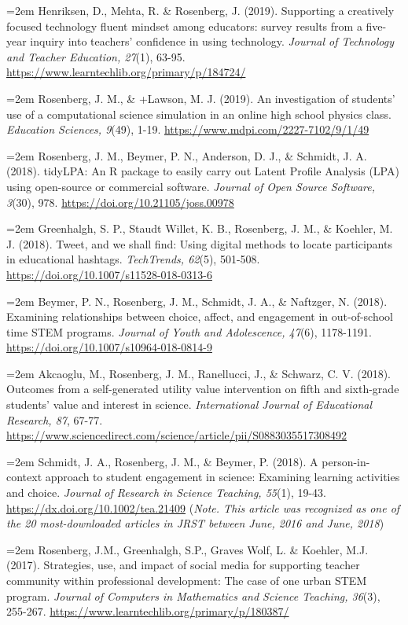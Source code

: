 \documentclass[
  14,
]{article}
\begin{document}
\hangindent=2em Henriksen, D., Mehta, R. \& Rosenberg, J. (2019).
Supporting a creatively focused technology fluent mindset among
educators: survey results from a five-year inquiry into teachers'
confidence in using technology. \emph{Journal of Technology and Teacher
Education, 27}(1), 63-95.
\url{https://www.learntechlib.org/primary/p/184724/}

\hangindent=2em Rosenberg, J. M., \& +Lawson, M. J. (2019). An
investigation of students' use of a computational science simulation in
an online high school physics class. \emph{Education Sciences, 9}(49),
1-19. \url{https://www.mdpi.com/2227-7102/9/1/49}

\hangindent=2em Rosenberg, J. M., Beymer, P. N., Anderson, D. J., \&
Schmidt, J. A. (2018). tidyLPA: An R package to easily carry out Latent
Profile Analysis (LPA) using open-source or commercial software.
\emph{Journal of Open Source Software, 3}(30), 978.
\url{https://doi.org/10.21105/joss.00978}

\hangindent=2em Greenhalgh, S. P., Staudt Willet, K. B., Rosenberg, J.
M., \& Koehler, M. J. (2018). Tweet, and we shall find: Using digital
methods to locate participants in educational hashtags.
\emph{TechTrends, 62}(5), 501-508.
\url{https://doi.org/10.1007/s11528-018-0313-6}

\hangindent=2em Beymer, P. N., Rosenberg, J. M., Schmidt, J. A., \&
Naftzger, N. (2018). Examining relationships between choice, affect, and
engagement in out-of-school time STEM programs. \emph{Journal of Youth
and Adolescence, 47}(6), 1178-1191.
\url{https://doi.org/10.1007/s10964-018-0814-9}

\hangindent=2em Akcaoglu, M., Rosenberg, J. M., Ranellucci, J., \&
Schwarz, C. V. (2018). Outcomes from a self-generated utility value
intervention on fifth and sixth-grade students' value and interest in
science. \emph{International Journal of Educational Research, 87},
67-77.
\url{https://www.sciencedirect.com/science/article/pii/S0883035517308492}

\hangindent=2em Schmidt, J. A., Rosenberg, J. M., \& Beymer, P. (2018).
A person-in-context approach to student engagement in science: Examining
learning activities and choice. \emph{Journal of Research in Science
Teaching, 55}(1), 19-43. \url{https://dx.doi.org/10.1002/tea.21409}
(\emph{Note. This article was recognized as one of the 20
most-downloaded articles in JRST between June, 2016 and June, 2018})

\hangindent=2em Rosenberg, J.M., Greenhalgh, S.P., Graves Wolf, L. \&
Koehler, M.J. (2017). Strategies, use, and impact of social media for
supporting teacher community within professional development: The case
of one urban STEM program. \emph{Journal of Computers in Mathematics and
Science Teaching, 36}(3), 255-267.
\url{https://www.learntechlib.org/primary/p/180387/}
\end{document}
